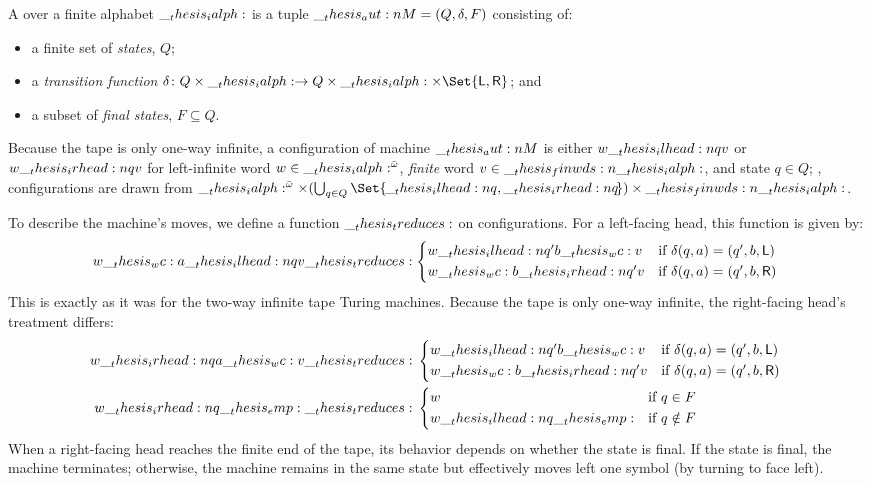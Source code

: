 \begin{definition}
  A  over a finite alphabet $\__thesis_ialph:$ is a tuple $\__thesis_aut:n {M} = (Q, \delta, F)$ consisting of:
  \begin{itemize}
  \item a finite set of \emph{states}, $Q$;
  \item a \emph{transition function} $\delta\colon Q \times \ialph \to Q \times \ialph \times \Set{\mathsf{L}, \mathsf{R}}$; and
  \item a subset of \emph{final states}, $F \subseteq Q$.
  \end{itemize}
  Because the tape is only one-way infinite, a configuration of machine $\__thesis_aut:n {M}$ is either $w \__thesis_ilhead:n {q} v$ or $w \__thesis_irhead:n {q} v$ for left-infinite word $w \in \__thesis_ialph:^{\bar{\omega}}$, \emph{finite} word $v \in \__thesis_finwds:n {\__thesis_ialph:}$, and state $q \in Q$; \ie, configurations are drawn from $\ialph^{\bar{\omega}} \times (\bigcup_{q \in Q} \Set{\!{} \itlhead{q} {}, {} \itrhead{q} {}\!}) \times \finwds{\ialph}$.

  To describe the machine's moves, we define a function $\__thesis_treduces:$ on configurations.
  For a left-facing head, this function is given by:
  \begin{equation*}
      w \wc a \itlhead{q} v \treduces
        \begin{cases*}
          w \itlhead{q'} b \wc v & if $\delta(q, a) = (q', b, \mathsf{L})$ \\
          w \wc b \itrhead{q'} v & if $\delta(q, a) = (q', b, \mathsf{R})$
        \end{cases*}
  \end{equation*}
  This is exactly as it was for the two-way infinite tape Turing machines.
  Because the tape is only one-way infinite, the right-facing head's treatment differs:
  \begin{equation*}
    \!\begin{aligned}
      w \itrhead{q} a \wc v \treduces {} &
        \begin{cases*}
          w \itlhead{q'} b \wc v & if $\delta(q, a) = (q', b, \mathsf{L})$ \\
          w \wc b \itrhead{q'} v & if $\delta(q, a) = (q', b, \mathsf{R})$
        \end{cases*}
      \\
      w \itrhead{q} \emp \treduces {} &
        \begin{cases*}
          w & if $q \in F$ \\
          w \itlhead{q} \emp & if $q \notin F$
        \end{cases*}
    \end{aligned}
  \end{equation*}
  When a right-facing head reaches the finite end of the tape, its behavior depends on whether the state is final.
  If the state is final, the machine terminates; otherwise, the machine remains in the same state but effectively moves left one symbol (by turning to face left).
\end{definition}

